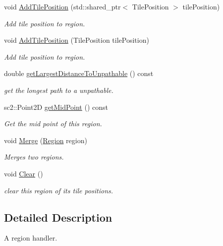 \begin{DoxyCompactItemize}
\item 
void \hyperlink{classOverseer_1_1Region_afcaa70e448891547ef6fd62a259c2408}{Add\+Tile\+Position} (std\+::shared\+\_\+ptr$<$ Tile\+Position $>$ tile\+Position)
\begin{DoxyCompactList}\small\item\em Add tile position to region. \end{DoxyCompactList}\item 
void \hyperlink{classOverseer_1_1Region_a831c30bf7feea8a8897d3c99bbaf87d2}{Add\+Tile\+Position} (Tile\+Position tile\+Position)
\begin{DoxyCompactList}\small\item\em Add tile position to region. \end{DoxyCompactList}\item 
double \hyperlink{classOverseer_1_1Region_a25b4ea47336ca35c9bdbe557c27575a4}{get\+Largest\+Distance\+To\+Unpathable} () const 
\begin{DoxyCompactList}\small\item\em get the longest path to a unpathable. \end{DoxyCompactList}\item 
sc2\+::\+Point2D \hyperlink{classOverseer_1_1Region_a84817e4b71bd078d55124ba6a2817a74}{get\+Mid\+Point} () const 
\begin{DoxyCompactList}\small\item\em Get the mid point of this region. \end{DoxyCompactList}\item 
void \hyperlink{classOverseer_1_1Region_af1d0842a7f894786baa4a5af469b608d}{Merge} (\hyperlink{classOverseer_1_1Region}{Region} region)
\begin{DoxyCompactList}\small\item\em Merges two regions. \end{DoxyCompactList}\item 
void \hyperlink{classOverseer_1_1Region_aff2d0229f2943c243d1a28f4e3c85a06}{Clear} ()\hypertarget{classOverseer_1_1Region_aff2d0229f2943c243d1a28f4e3c85a06}{}\label{classOverseer_1_1Region_aff2d0229f2943c243d1a28f4e3c85a06}

\begin{DoxyCompactList}\small\item\em clear this region of its tile positions. \end{DoxyCompactList}\end{DoxyCompactItemize}


\subsection{Detailed Description}
A region handler. 

